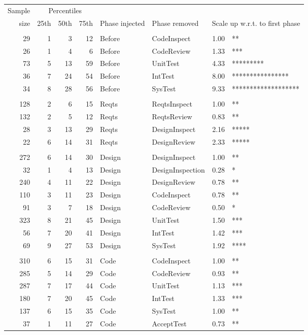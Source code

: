 \documentclass{sig-alternate}
\def\baselinestretch{1}
\begin{document}
\begin{figure}[!t] 
 \renewcommand{\baselinestretch}{0.7}
 \scriptsize
\begin{center}
\begin{tabular}{r|rrr|ll|rl}
  Sample&\multicolumn{3}{c|}{Percentiles}\\ 
size & 25th & 50th & 75th & Phase injected & Phase removed & \multicolumn{2}{l}{Scale up w.r.t. to first phase}\\\hline
\\
  29 &     1 &     3 &    12 & Before & CodeInspect  & 1.00  &  **  \\
  26 &     1 &     4 &     6 & Before & CodeReview  & 1.33  &  ***  \\
  73 &     5 &    13 &    59 & Before & UnitTest  & 4.33  &  *********  \\
  36 &     7 &    24 &    54 & Before & IntTest  & 8.00  &  ****************  \\
  34 &     8 &    28 &    56 & Before & SysTest  & 9.33  &  *******************  \\\hline
\\
128 &     2 &     6 &    15 & Reqts & ReqtsInspect  & 1.00  &  **  \\
132 &     2 &     5 &    12 & Reqts & ReqtsReview  & 0.83  &  **  \\
 28 &     3 &    13 &    29 & Reqts & DesignInspect  & 2.16  &  *****  \\
 22 &     6 &    14 &    31 & Reqts & DesignReview  & 2.33  &  *****  \\\hline
\\
272 &     6 &    14 &    30 & Design & DesignInspect  & 1.00  &  **  \\
 32 &     1 &     4 &    13 & Design & DesignInspection  & 0.28  &  *  \\
240 &     4 &    11 &    22 & Design & DesignReview  & 0.78  &  **  \\
110 &     3 &    11 &    23 & Design & CodeInspect  & 0.78  &  **  \\
 91 &     3 &     7 &    18 & Design & CodeReview  & 0.50  &  *  \\
323 &     8 &    21 &    45 & Design & UnitTest  & 1.50  &  ***  \\
 56 &     7 &    20 &    41 & Design & IntTest  & 1.42  &  ***  \\
 69 &     9 &    27 &    53 & Design & SysTest  & 1.92  &  ****  \\\hline
\\
310 &     6 &    15 &    31 & Code & CodeInspect  & 1.00  &  **  \\
285 &     5 &    14 &    29 & Code & CodeReview  & 0.93  &  **  \\
287 &     7 &    17 &    44 & Code & UnitTest  & 1.13  &  ***  \\
180 &     7 &    20 &    45 & Code & IntTest  & 1.33  &  ***  \\
137 &     6 &    15 &    35 & Code & SysTest  & 1.00  &  **  \\
 37 &     1 &    11 &    27 & Code & AcceptTest  & 0.73  &  **  \\


\end{tabular}
\end{center}
\end{figure}
\end{document}
